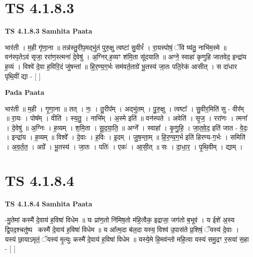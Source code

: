 \documentclass[17pt]{extarticle}
\begin{document}
\section*{ TS 4.1.8.3 }

\textbf{TS 4.1.8.3 } \newline
\textbf{Samhita Paata} \newline

भार॑ती । म॒ही गृ॑णा॒ना ॥ तन्न॑स्तु॒रीप॒मद्भु॑तं पुरु॒क्षु त्वष्टा॑ सु॒वीरं᳚ । रा॒यस्पोषं॒ ॅवि ष्य॑तु॒ नाभि॑म॒स्मे ॥ वन॑स्प॒तेऽव॑ सृजा॒ ररा॑ण॒स्त्मना॑ दे॒वेषु॑ । अ॒ग्निर्.ह॒व्यꣳ श॑मि॒ता सू॑दयाति ॥ अग्ने॒ स्वाहा॑ कृणुहि जातवेद॒ इन्द्रा॑य ह॒व्यं । विश्वे॑ दे॒वा ह॒विरि॒दं जु॑षन्तां ॥ हि॒र॒ण्य॒ग॒र्भः सम॑वर्त॒ताग्रे॑ भू॒तस्य॑ जा॒तः पति॒रेक॑ आसीत् । स दा॑धार पृथि॒वीं द्या - [  ] \newline

\textbf{Pada Paata} \newline

भार॑ती ॥ म॒ही । गृ॒णा॒ना ॥ तत् । नः॒ । तु॒रीप᳚म् । अद्भु॑तम् । पु॒रु॒क्षु । त्वष्टा᳚ । सु॒वीर॒मिति॑ सु - वीर᳚म् ॥ रा॒यः । पोष᳚म् । वीति॑ । स्य॒तु॒ । नाभि᳚म् । अ॒स्मे इति॑ ॥ वन॑स्पते । अवेति॑ । सृ॒ज॒ । ररा॑णः । त्मना᳚ । दे॒वेषु॑ ॥ अ॒ग्निः । ह॒व्यम् । श॒मि॒ता । सू॒द॒या॒ति॒ ॥ अग्ने᳚ । स्वाहा᳚ । कृ॒णु॒हि॒ । जा॒त॒वे॒द॒ इति॑ जात - वे॒दः॒ । इन्द्रा॑य । ह॒व्यम् ॥ विश्वे᳚ । दे॒वाः । ह॒विः । इ॒दम् । जु॒ष॒न्ता॒म् ॥ हि॒र॒ण्य॒ग॒र्भ इति॑ हिरण्य-ग॒र्भः । समिति॑ । अ॒व॒र्त॒त॒ । अग्रे᳚ । भू॒तस्य॑ । जा॒तः । पतिः॑ । एकः॑ । आ॒सी॒त् ॥ सः । दा॒धा॒र॒ । पृ॒थि॒वीम् । द्याम् ।  \newline




\section*{ TS 4.1.8.4 }

\textbf{TS 4.1.8.4 } \newline
\textbf{Samhita Paata} \newline

-मु॒तेमां कस्मै॑ दे॒वाय॑ ह॒विषा॑ विधेम ॥ यः प्रा॑ण॒तो नि॑मिष॒तो म॑हि॒त्वैक॒ इद्राजा॒ जग॑तो ब॒भूव॑ । य ईशे॑ अ॒स्य द्वि॒पद॒श्चतु॑ष्पदः᳡कस्मै॑ दे॒वाय॑ ह॒विषा॑ विधेम ॥ य आ᳚त्म॒दा ब॑ल॒दा यस्य॒ विश्व॑ उ॒पास॑ते प्र॒शिषं॒ ॅयस्य॑ दे॒वाः । यस्य॑ छा॒याऽमृतं॒ ॅयस्य॑ मृ॒त्युः कस्मै॑ दे॒वाय॑ ह॒विषा॑ विधेम ॥ यस्ये॒मे हि॒मव॑न्तो महि॒त्वा यस्य॑ समु॒द्रꣳ र॒सया॑ स॒हा - [  ] \newline
\end{document}
